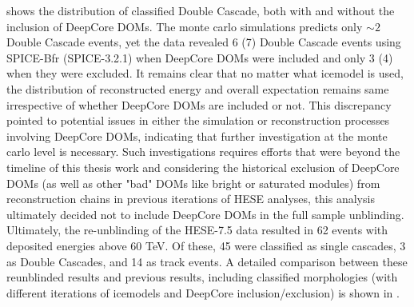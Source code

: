  shows the distribution of classified Double Cascade, both with and without the inclusion of DeepCore DOMs. The monte carlo simulations predicts only $\sim 2$ Double Cascade events, yet the data revealed 6 (7) Double Cascade events using SPICE-Bfr (SPICE-3.2.1) when DeepCore DOMs were included and only 3 (4) when they were excluded. It remains clear that no matter what icemodel is used, the distribution of reconstructed energy and overall expectation remains same irrespective of whether DeepCore DOMs are included or not. This discrepancy pointed to potential issues in either the simulation or reconstruction processes involving DeepCore DOMs, indicating that further investigation at the monte carlo level is necessary. Such investigations requires efforts that were beyond the timeline of this thesis work and  considering the historical exclusion of DeepCore DOMs (as well as other "bad" DOMs like bright or saturated modules) from reconstruction chains in previous iterations of HESE analyses, this analysis ultimately decided not to include DeepCore DOMs in the full sample unblinding. Ultimately, the re-unblinding of the HESE-7.5 data resulted in 62 events with deposited energies above 60 TeV. Of these, 45 were classified as single cascades, 3 as Double Cascades, and 14 as track events. A detailed comparison between these  reunblinded results and previous results, including classified morphologies (with different iterations of icemodels and DeepCore inclusion/exclusion) is shown in .

